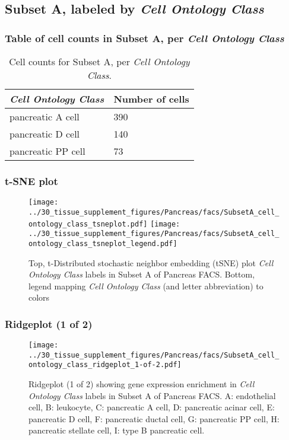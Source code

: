 \clearpage

\subsection{Subset A, labeled by \emph{Cell Ontology Class}}
\subsubsection{Table of cell counts in Subset A, per \emph{Cell Ontology Class}}\begin{table}[h]
\centering
\label{my-label}
\begin{tabular}{@{}ll@{}}
\toprule

\emph{Cell Ontology Class}& Number of cells \\ \midrule
pancreatic A cell & 390 \\

pancreatic D cell & 140 \\

pancreatic PP cell & 73 \\
\bottomrule
\end{tabular}
\caption{Cell counts for Subset A, per \emph{Cell Ontology Class}.}
\end{table}

\clearpage
\subsubsection{t-SNE plot}
\begin{figure}[h]
\centering
\texttt{[image: ../30\_tissue\_supplement\_figures/Pancreas/facs/SubsetA\_cell\_ontology\_class\_tsneplot.pdf]}
\texttt{[image: ../30\_tissue\_supplement\_figures/Pancreas/facs/SubsetA\_cell\_ontology\_class\_tsneplot\_legend.pdf]}
\caption{Top, t-Distributed stochastic neighbor embedding (tSNE) plot  \emph{Cell Ontology Class} labels in Subset A of Pancreas FACS. Bottom, legend mapping \emph{Cell Ontology Class} (and letter abbreviation) to colors}
\end{figure}


\clearpage

\subsubsection{Ridgeplot (1 of 2)}
\begin{figure}[h]
\centering
\texttt{[image: ../30\_tissue\_supplement\_figures/Pancreas/facs/SubsetA\_cell\_ontology\_class\_ridgeplot\_1-of-2.pdf]}

\caption{ Ridgeplot (1 of 2)  showing gene expression enrichment in \emph{Cell Ontology Class} labels in Subset A of Pancreas FACS. A: endothelial cell, B: leukocyte, C: pancreatic A cell, D: pancreatic acinar cell, E: pancreatic D cell, F: pancreatic ductal cell, G: pancreatic PP cell, H: pancreatic stellate cell, I: type B pancreatic cell.}
\end{figure}


